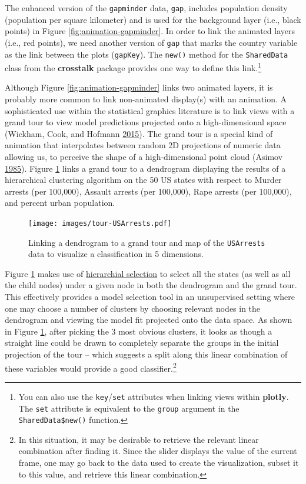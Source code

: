 \documentclass[12pt,]{isuthesis}
\let\rmarkdownfootnote\footnote%
\def\footnote{\protect\rmarkdownfootnote}
\begin{document}
The enhanced version of the \texttt{gapminder} data, \texttt{gap},
includes population density (population per square kilometer) and is
used for the background layer (i.e., black points) in Figure
\ref{fig:animation-gapminder}. In order to link the animated layers
(i.e., red points), we need another version of \texttt{gap} that marks
the country variable as the link between the plots (\texttt{gapKey}).
The \texttt{new()} method for the \texttt{SharedData} class from the
\textbf{crosstalk} package provides one way to define this
link.\footnote{You can also use the \texttt{key}/\texttt{set} attributes
  when linking views within \textbf{plotly}. The \texttt{set} attribute
  is equivalent to the \texttt{group} argument in the
  \texttt{SharedData\$new()} function.}

Although Figure \ref{fig:animation-gapminder} links two animated layers,
it is probably more common to link non-animated display(s) with an
animation. A sophisticated use within the statistical graphics
literature is to link views with a grand tour to view model predictions
projected onto a high-dimensional space (Wickham, Cook, and Hofmann
\protect\hyperlink{ref-model-vis-paper}{2015}). The grand tour is a
special kind of animation that interpolates between random 2D
projections of numeric data allowing us, to perceive the shape of a
high-dimensional point cloud (Asimov
\protect\hyperlink{ref-grand-tour}{1985}). Figure
\ref{fig:tour-USArrests} links a grand tour to a dendrogram displaying
the results of a hierarchical clustering algorithm on the 50 US states
with respect to Murder arrests (per 100,000), Assault arrests (per
100,000), Rape arrests (per 100,000), and percent urban population.

\begin{figure}
\centering
\texttt{[image: images/tour-USArrests.pdf]}
\caption{\label{fig:tour-USArrests}Linking a dendrogram to a grand tour and
map of the \texttt{USArrests} data to visualize a classification in 5
dimensions.}
\end{figure}

Figure \ref{fig:tour-USArrests} makes use of
\protect\hyperlink{hierarchial-selection}{hierarchial selection} to
select all the states (as well as all the child nodes) under a given
node in both the dendrogram and the grand tour. This effectively
provides a model selection tool in an unsupervised setting where one may
choose a number of clusters by choosing relevant nodes in the dendrogram
and viewing the model fit projected onto the data space. As shown in
Figure \ref{fig:tour-USArrests}, after picking the 3 most obvious
clusters, it looks as though a straight line could be drawn to
completely separate the groups in the initial projection of the tour --
which suggests a split along this linear combination of these variables
would provide a good classifier.\footnote{In this situation, it may be
  desirable to retrieve the relevant linear combination after finding
  it. Since the slider displays the value of the current frame, one may
  go back to the data used to create the visualization, subset it to
  this value, and retrieve this linear combination.}
\end{document}

